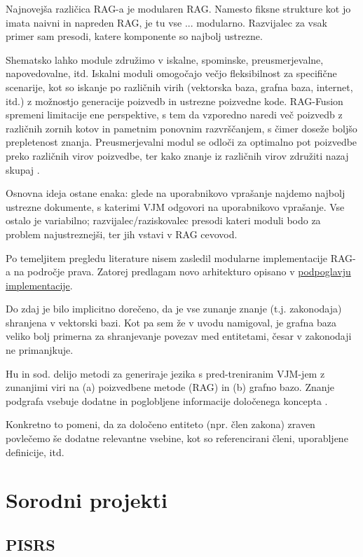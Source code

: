\documentclass[a4paper,12pt,openright]{book}
\begin{document}
Najnovejša različica RAG-a je modularen RAG. Namesto fiksne strukture kot jo imata naivni in napreden RAG, je tu vse ... modularno. Razvijalec za vsak primer sam presodi, katere komponente so najbolj ustrezne. 

Shematsko lahko module združimo v iskalne, spominske, preusmerjevalne, napovedovalne, itd. Iskalni moduli omogočajo večjo fleksibilnost za specifične scenarije, kot so iskanje po različnih virih (vektorska baza, grafna baza, internet, itd.) z možnostjo generacije poizvedb in ustrezne poizvedne kode. RAG-Fusion spremeni limitacije ene perspektive, s tem da vzporedno naredi več poizvedb z različnih zornih kotov in pametnim ponovnim razvrščanjem, s čimer doseže boljšo prepletenost znanja. Preusmerjevalni modul se odloči za optimalno pot poizvedbe preko različnih virov poizvedbe, ter kako znanje iz različnih virov združiti nazaj skupaj \cite{rag_survey}.

Osnovna ideja ostane enaka: glede na uporabnikovo vprašanje najdemo najbolj ustrezne dokumente, s katerimi VJM odgovori na uporabnikovo vprašanje. Vse ostalo je variabilno; razvijalec/raziskovalec presodi kateri moduli bodo za problem najustreznejši, ter jih vstavi v RAG cevovod.

Po temeljitem pregledu literature nisem zasledil modularne implementacije RAG-a na področje prava. Zatorej predlagam novo arhitekturo opisano v \hyperref[llm_kg_rag]{podpoglavju implementacije}.

Do zdaj je bilo implicitno dorečeno, da je vse zunanje znanje (t.j. zakonodaja) shranjena v vektorski bazi. Kot pa sem že v uvodu namigoval, je grafna baza veliko bolj primerna za shranjevanje povezav med entitetami, česar v zakonodaji ne primanjkuje.

Hu in sod. delijo metodi za generiraje jezika s pred-treniranim VJM-jem z zunanjimi viri na (a) poizvedbene metode (RAG) in (b) grafno bazo. Znanje podgrafa vsebuje dodatne in poglobljene informacije določenega koncepta \cite{hu_survey}.

Konkretno to pomeni, da za določeno entiteto (npr. člen zakona) zraven povlečemo še dodatne relevantne vsebine, kot so referencirani členi, uporabljene definicije, itd.

\section{Sorodni projekti}

\subsection{PISRS}
\end{document}

